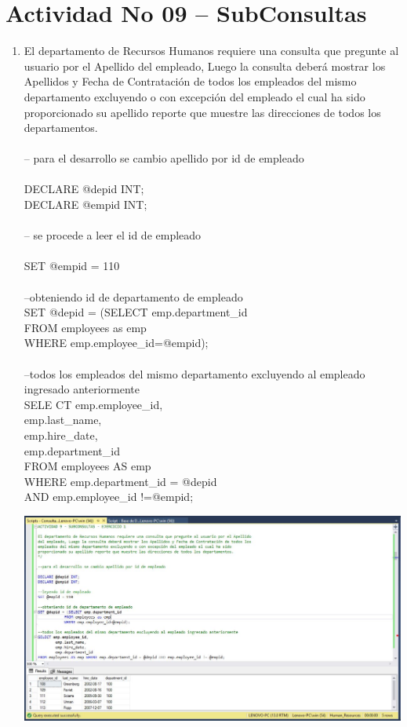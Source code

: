\section{Actividad No 09 – SubConsultas} 
		
\begin{enumerate}[1.]
	\item El departamento de Recursos Humanos requiere una consulta que pregunte al usuario por el Apellido del empleado, Luego la consulta deber\'a mostrar los Apellidos y Fecha de Contrataci\'on de todos los empleados del mismo departamento excluyendo o con excepción del empleado el cual ha sido proporcionado su apellido reporte que muestre las direcciones de todos los departamentos.
	\\
	\\-- para el desarrollo se cambio apellido por id de empleado
	\\
	\\DECLARE @depid INT;
	\\DECLARE @empid INT;
	\\
	\\--  se procede a leer el id de empleado
	\\
	\\SET @empid = 110
	\\
	\\--obteniendo id de departamento de empleado
	\\SET @depid = (SELECT emp.department\_id
	\\			FROM employees as emp
	\\			WHERE emp.employee\_id=@empid);
	\\
	\\--todos los empleados del mismo departamento excluyendo al empleado ingresado anteriormente
	\\SELE	CT emp.employee\_id,
	\\		emp.last\_name,
	\\		emp.hire\_date,
	\\		emp.department\_id
	\\FROM employees AS emp 
	\\WHERE emp.department\_id = @depid 
	\\AND emp.employee\_id !=@empid;\\

	\begin{center}
	\includegraphics[width=17cm]{./Imagenes/Actividad9-Ejercicio01} 
	\end{center}


\end{enumerate}
